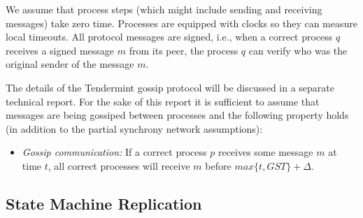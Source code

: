 We assume that process steps (which might include sending and receiving
messages) take zero time.  Processes are equipped with clocks so they can
measure local timeouts.  All protocol messages are signed, i.e., when a correct
process $q$ receives a signed message $m$ from its peer, the process $q$ can
verify who was the original sender of the message $m$.

The details of the Tendermint gossip protocol will be discussed in a separate
technical report. For the sake of this report it is sufficient to assume that
messages are being gossiped between processes and the following property holds
(in addition to the partial synchrony network assumptions):

\begin{itemize} \item \emph{Gossip communication:} If a correct process $p$
    receives some message $m$ at time $t$, all correct processes will receive
    $m$ before $max\{t, GST\} + \Delta$.    \end{itemize}




\subsection{State Machine Replication}

